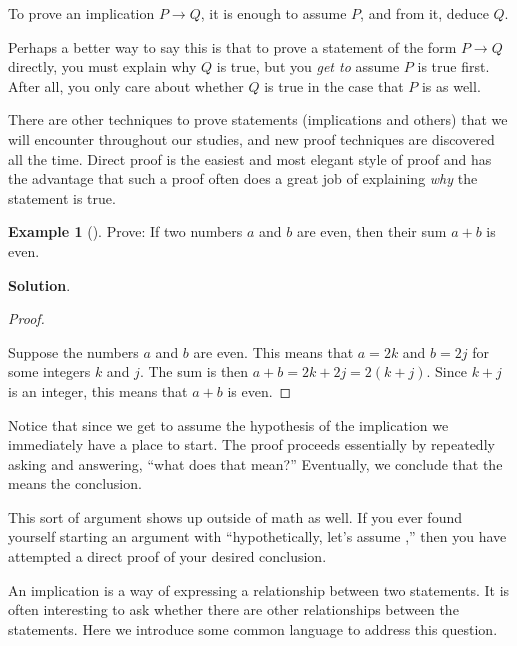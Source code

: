 \documentclass[10pt,]{book}
\theoremstyle{plain}
\theoremstyle{definition}
\theoremstyle{definition}
\newtheorem{example}[theorem]{Example}
\theoremstyle{definition}
\theoremstyle{definition}
\numberwithin{equation}{chapter}
\def\imp{\rightarrow}
\begin{document}
\begin{assemblage}\label{assemblage-18}
\hypertarget{p-1397}{}%
To prove an implication \(P \imp Q\), it is enough to assume \(P\), and from it, deduce \(Q\).%
\end{assemblage}
\hypertarget{p-1398}{}%
Perhaps a better way to say this is that to prove a statement of the form \(P \imp Q\) directly, you must explain why \(Q\) is true, but you \emph{get to} assume \(P\) is true first.  After all, you only care about whether \(Q\) is true in the case that \(P\) is as well.%
\par
\hypertarget{p-1399}{}%
There are other techniques to prove statements (implications and others) that we will encounter throughout our studies, and new proof techniques are discovered all the time. Direct proof is the easiest and most elegant style of proof and has the advantage that such a proof often does a great job of explaining \emph{why} the statement is true.%
\begin{example}[]\label{example-33}
\hypertarget{p-1400}{}%
Prove: If two numbers \(a\) and \(b\) are even, then their sum \(a+b\) is even.%
\par\smallskip%
\noindent\textbf{Solution}.\hypertarget{solution-120}{}\quad%
\begin{proof}\hypertarget{proof-17}{}
\hypertarget{p-1401}{}%
Suppose the numbers \(a\) and \(b\) are even. This means that  \(a = 2k\) and \(b=2j\) for some integers \(k\) and \(j\). The sum is then \(a+b = 2k+2j = 2(k+j)\). Since \(k+j\) is an integer, this means that \(a+b\) is even.%
\end{proof}
\hypertarget{p-1402}{}%
Notice that since we get to assume the hypothesis of the implication we immediately have a place to start. The proof proceeds essentially by repeatedly asking and answering, ``what does that mean?''  Eventually, we conclude that the means the conclusion.%
\end{example}
\hypertarget{p-1403}{}%
This sort of argument shows up outside of math as well. If you ever found yourself starting an argument with ``hypothetically, let's assume \textellipsis{},'' then you have attempted a direct proof of your desired conclusion.%
\par
\hypertarget{p-1404}{}%
An implication is a way of expressing a relationship between two statements.  It is often interesting to ask whether there are other relationships between the statements.  Here we introduce some common language to address this question.%
\end{document}
